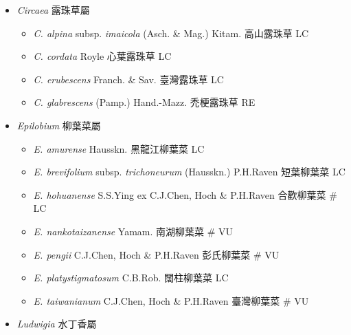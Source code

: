 
  \begin{itemize}
 \item[] \textit{Circaea} 露珠草屬
                                
  \begin{itemize}
        \item[] \textit{C. alpina} subsp. \textit{imaicola} (Asch. \& Mag.) Kitam.  高山露珠草   LC
        \item[] \textit{C. cordata} Royle  心葉露珠草   LC
        \item[] \textit{C. erubescens} Franch. \& Sav.  臺灣露珠草   LC
        \item[] \textit{C. glabrescens} (Pamp.) Hand.-Mazz.  禿梗露珠草   RE
  \end{itemize}
 \item[] \textit{Epilobium} 柳葉菜屬
                                
  \begin{itemize}
        \item[] \textit{E. amurense} Hausskn.  黑龍江柳葉菜   LC
        \item[] \textit{E. brevifolium} subsp. \textit{trichoneurum} (Hausskn.) P.H.Raven  短葉柳葉菜   LC
        \item[] \textit{E. hohuanense} S.S.Ying ex C.J.Chen, Hoch \& P.H.Raven  合歡柳葉菜  \# LC
        \item[] \textit{E. nankotaizanense} Yamam.  南湖柳葉菜  \# VU
        \item[] \textit{E. pengii} C.J.Chen, Hoch \& P.H.Raven  彭氏柳葉菜  \# VU
        \item[] \textit{E. platystigmatosum} C.B.Rob.  闊柱柳葉菜   LC
        \item[] \textit{E. taiwanianum} C.J.Chen, Hoch \& P.H.Raven  臺灣柳葉菜  \# VU
  \end{itemize}
 \item[] \textit{Ludwigia} 水丁香屬
                                

\end{itemize}
